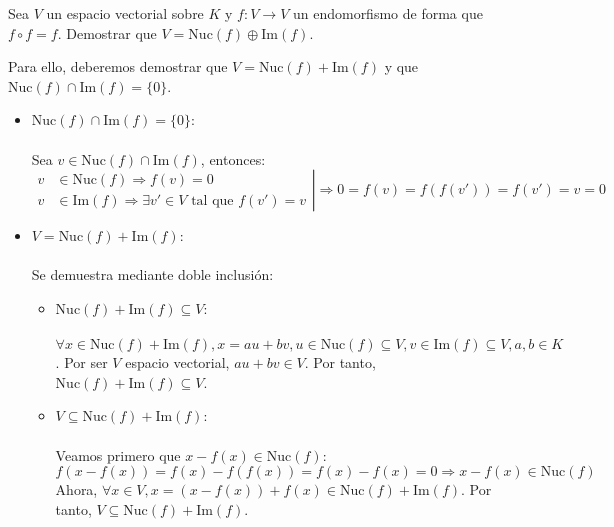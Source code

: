 \begin{ejercicio}
	Sea \( V \) un espacio vectorial sobre \( K \) y \( f : V \rightarrow V \) un endomorfismo de forma que \( f \circ f = f \). Demostrar que \( V = \text{Nuc}(f) \oplus \text{Im}(f) \).

	Para ello, deberemos demostrar que $V = \text{Nuc}(f) + \text{Im}(f)$ y que $\text{Nuc}(f) \cap \text{Im}(f) = \{0\}$.
	\begin{itemize}
		\item $\text{Nuc}(f) \cap \text{Im}(f) = \{0\}$:
		      \\ \\
		      Sea $v \in \text{Nuc}(f) \cap \text{Im}(f)$, entonces:
		      \begin{equation*}
			      \left.
			      \begin{aligned}
				      v & \in \text{Nuc}(f) \Rightarrow f(v) = 0                                   \\
				      v & \in \text{Im}(f) \Rightarrow \exists v' \in V \text{ tal que } f(v') = v
			      \end{aligned}
			      \right| \Rightarrow 0 = f(v) = f(f(v')) = f(v') = v  = 0
		      \end{equation*}
		\item $V = \text{Nuc}(f) + \text{Im}(f)$:
		      \\ \\
		      Se demuestra mediante doble inclusión:
		      \begin{itemize}
			      \item $\text{Nuc}(f) + \text{Im}(f) \subseteq V$:
			            \\ \\
			            $\forall x \in \text{Nuc}(f) + \text{Im}(f), x = au + bv, u \in \text{Nuc}(f) \subseteq V , v \in \text{Im}(f) \subseteq V , a,b \in K$. Por ser
			            $V$ espacio vectorial, $au+bv \in V$. Por tanto, $\text{Nuc}(f) + \text{Im}(f) \subseteq V$.
			      \item $V \subseteq \text{Nuc}(f) + \text{Im}(f)$:
			            \\ \\
			            Veamos primero que $x-f(x) \in \text{Nuc}(f)$:
			            \begin{equation*}
				            f(x-f(x)) = f(x)-f(f(x)) = f(x)-f(x) = 0 \Rightarrow x-f(x) \in \text{Nuc}(f)
			            \end{equation*}
			            Ahora, $\forall x \in V, x = (x-f(x))+f(x) \in \text{Nuc}(f) + \text{Im}(f)$. Por tanto, $V \subseteq \text{Nuc}(f) + \text{Im}(f)$.
		      \end{itemize}
	\end{itemize}
\end{ejercicio}

